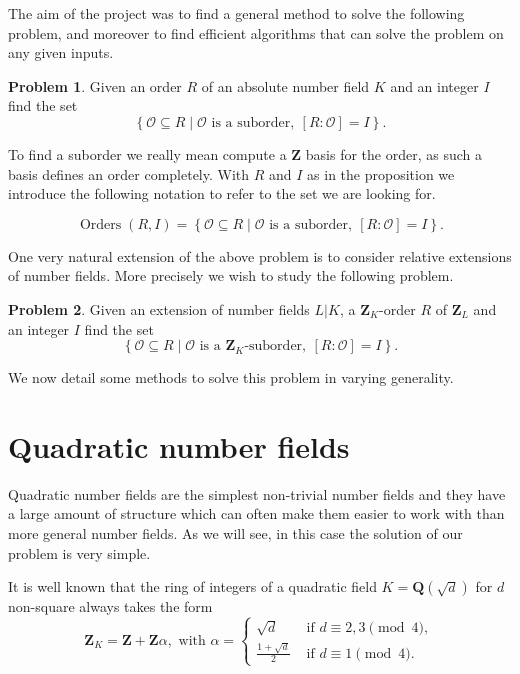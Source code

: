 \documentclass[a4paper,abstracton,bibtotoc]{scrreprt}
\theoremstyle{definition}
\newtheorem{prob}{Problem}
\newcommand{\QQ}{\mathbf{Q}}
\newcommand{\ZZ}{\mathbf{Z}}
\renewcommand{\O}{\mathcal{O}}
\DeclareMathOperator{\Orders}{Orders}
\begin{document}
The aim of the project was to find a general method to solve the following problem, and moreover to find efficient algorithms that can solve the problem on any given inputs.

\begin{prob}
Given an order $R$ of an absolute number field $K$ and an integer $I$ find the set
\[\left\{ \O\subseteq R \mid \O\text{ is a suborder},\ [R:\O] = I\right\}.\]
\end{prob}

To find a suborder we really mean compute a $\ZZ$ basis for the order, as such a basis defines an order completely.
With $R$ and $I$ as in the proposition we introduce the following notation to refer to the set we are looking for.

\[\Orders(R,I) = \left\{ \O\subseteq R \mid \O\text{ is a suborder},\ [R:\O] = I\right\}.\]

\minisec{}
One very natural extension of the above problem is to consider relative extensions of number fields.
More precisely we wish to study the following problem.

\begin{prob} %
Given an extension of number fields $L|K$, a $\ZZ_K$-order $R$ of $\ZZ_L$ and an integer $I$ find the set
\[\left\{ \O\subseteq R \mid \O\text{ is a $\ZZ_K$-suborder},\ [R:\O] = I\right\}.\]
\end{prob}

We now detail some methods to solve this problem in varying generality.

\section{Quadratic number fields}

Quadratic number fields are the simplest non-trivial number fields and they have a large amount of structure which can often make them easier to work with than more general number fields.
As we will see, in this case the solution of our problem is very simple.

It is well known \cite{lang} that the ring of integers of a quadratic field $K = \QQ(\sqrt{d})$ for $d$ non-square always takes the form
\[\ZZ_K = \ZZ + \ZZ\alpha,\text{ with } \alpha =\begin{cases}
\sqrt{d}&\text{ if $d\equiv 2,3\pmod{4}$},\\
\frac{1+\sqrt{d}}{2}&\text{ if $d\equiv 1\pmod{4}$}.
\end{cases}\]
\end{document}
